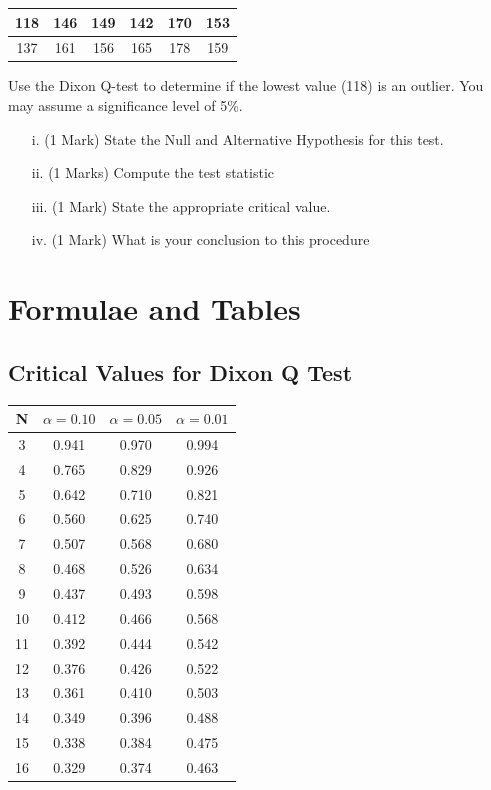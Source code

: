 \documentclass[a4paper,12pt]{article}
\begin{document}
\begin{center}
	\begin{tabular}{|c|c|c|c|c|c|}
		\hline
		118 & 146 & 149 & 142 & 170& 153\\ \hline
		137 & 161 & 156& 165&  178& 159
		\\ \hline
	\end{tabular}
\end{center}
Use the Dixon Q-test to determine if the lowest value (118) is an outlier. You may assume a significance level of 5\%.
\begin{itemize}
	\item[i.](1 Mark)	State the Null and Alternative Hypothesis for this test.
	\item[ii.](1 Marks) Compute the test statistic
	\item[iii.](1 Mark) State the appropriate critical value.
	\item[iv.](1 Mark) What is your conclusion to this procedure
\end{itemize}


\newpage


\section*{Formulae and Tables}
\subsection*{Critical Values for Dixon Q Test}
{
	\Large
	\begin{center}
		\begin{tabular}{|c|c|c|c|}
			\hline  N  & $\alpha=0.10$  & $\alpha=0.05$  & $\alpha=0.01$  \\ \hline
			3  & 0.941 & 0.970 & 0.994 \\ \hline
			4  & 0.765 & 0.829 & 0.926 \\ \hline
			5  & 0.642 & 0.710  & 0.821 \\ \hline
			6  & 0.560 & 0.625 & 0.740 \\ \hline
			7  & 0.507 & 0.568 & 0.680  \\ \hline
			8  & 0.468 & 0.526 & 0.634 \\ \hline
			9  & 0.437 & 0.493 & 0.598 \\ \hline
			10 & 0.412 & 0.466 & 0.568 \\ \hline
			11 & 0.392 & 0.444 & 0.542 \\ \hline
			12 & 0.376 & 0.426 & 0.522 \\ \hline
			13 & 0.361 & 0.410 & 0.503 \\ \hline
			14 & 0.349 & 0.396 & 0.488 \\ \hline
			15 & 0.338 & 0.384 & 0.475 \\ \hline
			16 & 0.329 & 0.374 & 0.463 \\ \hline
		\end{tabular} 
	\end{center}
}
\newpage
\end{document}
